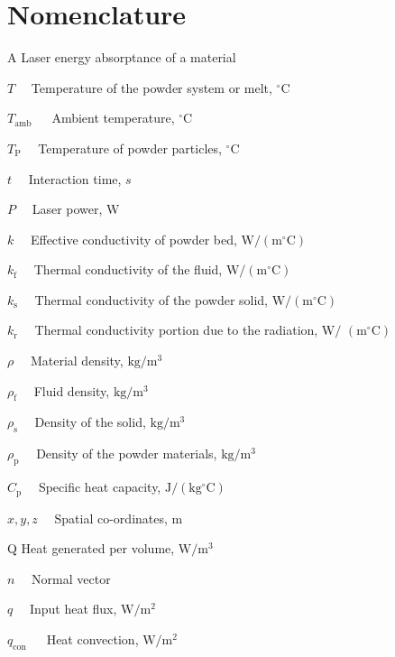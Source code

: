 \documentclass[10pt]{article}
\begin{document}
\section*{Nomenclature}
A Laser energy absorptance of a material

$T \quad$ Temperature of the powder system or melt, ${ }^{\circ} \mathrm{C}$

$T_{\text {amb }} \quad$ Ambient temperature, ${ }^{\circ} \mathrm{C}$

$T_{\mathrm{P}} \quad$ Temperature of powder particles, ${ }^{\circ} \mathrm{C}$

$t \quad$ Interaction time, $s$

$P \quad$ Laser power, $\mathrm{W}$

$k \quad$ Effective conductivity of powder bed, $\mathrm{W} /\left(\mathrm{m}{ }^{\circ} \mathrm{C}\right)$

$k_{\mathrm{f}} \quad$ Thermal conductivity of the fluid, $\mathrm{W} /\left(\mathrm{m}{ }^{\circ} \mathrm{C}\right)$

$k_{\mathrm{s}} \quad$ Thermal conductivity of the powder solid, $\mathrm{W} /\left(\mathrm{m}{ }^{\circ} \mathrm{C}\right)$

$k_{\mathrm{r}} \quad$ Thermal conductivity portion due to the radiation, $\mathrm{W} /$ $\left(\mathrm{m}{ }^{\circ} \mathrm{C}\right)$

$\rho \quad$ Material density, $\mathrm{kg} / \mathrm{m}^{3}$

$\rho_{\mathrm{f}} \quad$ Fluid density, $\mathrm{kg} / \mathrm{m}^{3}$

$\rho_{\mathrm{s}} \quad$ Density of the solid, $\mathrm{kg} / \mathrm{m}^{3}$

$\rho_{\mathrm{p}} \quad$ Density of the powder materials, $\mathrm{kg} / \mathrm{m}^{3}$

$C_{\mathrm{p}} \quad$ Specific heat capacity, $\mathrm{J} /\left(\mathrm{kg}{ }^{\circ} \mathrm{C}\right)$

$x, y, z \quad$ Spatial co-ordinates, $\mathrm{m}$

Q Heat generated per volume, $\mathrm{W} / \mathrm{m}^{3}$

$n \quad$ Normal vector

$q \quad$ Input heat flux, $\mathrm{W} / \mathrm{m}^{2}$

$q_{\text {con }} \quad$ Heat convection, $\mathrm{W} / \mathrm{m}^{2}$
\end{document}
